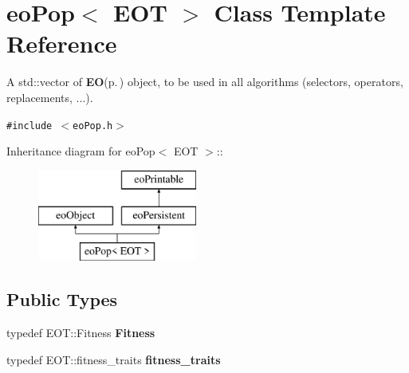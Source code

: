 \section{eo\-Pop$<$ EOT $>$ Class Template Reference}
\label{classeo_pop}
A std::vector of {\bf EO}{\rm (p.\,\pageref{class_e_o})} object, to be used in all algorithms (selectors, operators, replacements, ...).  


{\tt \#include $<$eo\-Pop.h$>$}

Inheritance diagram for eo\-Pop$<$ EOT $>$::\begin{figure}[H]
\begin{center}
\leavevmode
\includegraphics[height=3cm]{classeo_pop}
\end{center}
\end{figure}
\subsection*{Public Types}
\begin{CompactItemize}
\item 
typedef EOT::Fitness {\bf Fitness}\label{classeo_pop_w0}

\item 
typedef EOT::fitness\_\-traits {\bf fitness\_\-traits}\label{classeo_pop_w1}

\end{CompactItemize}
